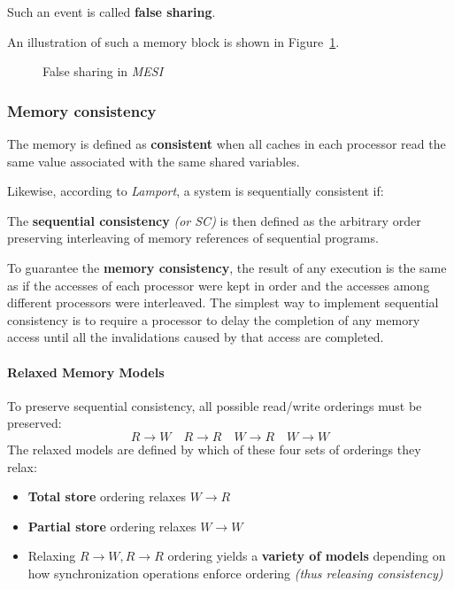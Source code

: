 \documentclass[english]{article}
\begin{document}
Such an event is called \textbf{false sharing}.

\bigskip
An illustration of such a memory block is shown in Figure~\ref{fig:MESI-false-sharing}.

\begin{figure}[htbp]
  \centering
  \bigskip
  \caption{False sharing in \textit{MESI}}
  \label{fig:MESI-false-sharing}
  \bigskip
\end{figure}

\subsubsection{Memory consistency}

The memory is defined as \textbf{consistent} when all caches in each processor read the same value associated with the same shared variables.

Likewise, according to \textit{Lamport}, a system is sequentially consistent if:


The \textbf{sequential consistency} \textit{(or SC)} is then defined as the arbitrary order preserving interleaving of memory references of sequential programs.

\bigskip
To guarantee the \textbf{memory consistency}, the result of any execution is the same as if the accesses of each processor were kept in order and the accesses among different processors were interleaved.
The simplest way to implement sequential consistency is to require a processor to delay the completion of any memory access until all the invalidations caused by that access are completed.

\paragraph{Relaxed Memory Models}

To preserve sequential consistency, all possible read/write orderings must be preserved:
\[R \rightarrow W \quad R \rightarrow R \quad W \rightarrow R \quad W \rightarrow W\]
The relaxed models are defined by which of these four sets of orderings they relax:

\begin{itemize}
  \item \textbf{Total store} ordering relaxes \(W \rightarrow R\)
  \item \textbf{Partial store} ordering relaxes \(W \rightarrow W\)
  \item Relaxing \(R \rightarrow W, R \rightarrow R\) ordering yields a \textbf{variety of models} depending on how synchronization operations enforce ordering \textit{(thus releasing consistency)}
\end{itemize}
\end{document}
